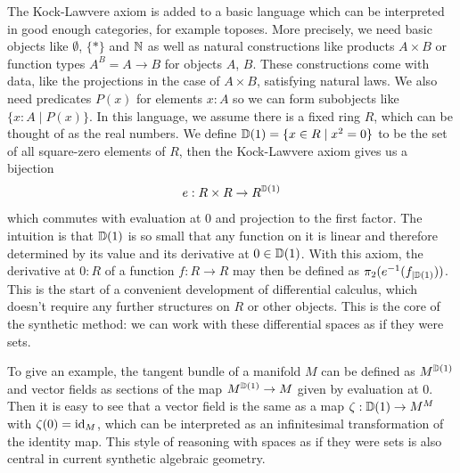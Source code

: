 The Kock-Lawvere axiom is added to a basic language which can be interpreted in good enough categories, for example toposes. More precisely, we need basic objects like $\emptyset$, $\{\ast\}$ and $\mathbb{N}$ as well as natural constructions like products $A\times B$ or function types $A^B=A\to B$ for objects $A$, $B$. These constructions come with data, like the projections in the case of $A\times B$, satisfying natural laws. We also need predicates $P(x)$ for elements $x:A$ so we can form subobjects like $\{x:A\mid P(x)\}$.
In this language, we assume there is a fixed ring $R$, which can be thought of as the real numbers. We define $\mathbb{D}(1)=\{x\in R\mid x^2=0\}$ to be the set of all square-zero elements of $R$, then the Kock-Lawvere axiom gives us a bijection
\[ e : R \times R  \to R^{\mathbb{D}(1)} \]
which commutes with evaluation at $0$ and projection to the first factor.
The intuition is that $\mathbb{D}(1)$ is so small that any function on it is linear and therefore determined by its value and its derivative at $0\in\mathbb{D}(1)$.
With this axiom, the derivative at $0:R$ of a function $f : R \to R$ may then be defined as $\pi_2(e^{-1}(f_{\vert \mathbb{D}(1)}))$. This is the start of a convenient development of differential calculus, which doesn't require any further structures on $R$ or other objects. This is the core of the synthetic method: we can work with these differential spaces as if they were sets.

To give an example, the tangent bundle of a manifold $M$ can be defined as $M^{\mathbb{D}(1)}$ and vector fields as sections of the map $M^{\mathbb{D}(1)}\to M$ given by evaluation at $0$. Then it is easy to see that a vector field is the same as a map $\zeta:\mathbb{D}(1)\to M^M$ with $\zeta(0)=\mathrm{id}_M$, which can be interpreted as an infinitesimal transformation of the identity map. This style of reasoning with spaces as if they were sets is also central in current synthetic algebraic geometry. 

